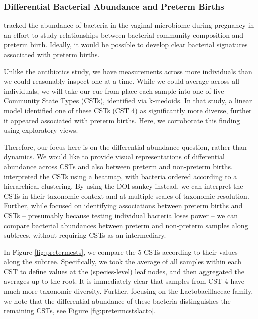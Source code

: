 \documentclass[12pt]{article}
\begin{document}
\subsubsection*{Differential Bacterial Abundance and Preterm
Births}\label{differential-bacterial-abundance-and-preterm-births}

\citet{digiulio2015temporal}
tracked the abundance of bacteria in the vaginal microbiome during
pregnancy in an effort to study relationships between bacterial
community composition and preterm birth. Ideally, it would be possible
to develop clear bacterial signatures associated with preterm births.

Unlike the antibiotics study, we have measurements across more
individuals than we could reasonably inspect one at a time. While we
could average across all individuals, we will take our cue from
\citep{digiulio2015temporal}
place each sample into one of five Community State Types (CSTs),
identified via k-medoids. In that study, a linear model identified one
of these CSTs (CST 4) as significantly more diverse, further it appeared
associated with preterm births. Here, we corroborate this finding using
exploratory views.

Therefore, our focus here is on the differential abundance question,
rather than dynamics. We would like to provide visual representations of
differential abundance across CSTs and also between preterm and non-preterm
births. \citet{digiulio2015temporal} interpreted the CSTs using a heatmap, with
bacteria ordered according to a hierarchical clustering. By using the DOI sankey
instead, we can interpret the CSTs in their taxonomic context and at multiple
scales of taxonomic resolution. Further, while 
\citep{digiulio2015temporal} focused on identifying associations between
preterm births and CSTs -- presumably because testing individual bacteria loses
power -- we can compare bacterial abundances between preterm and non-preterm
samples along subtrees, without requiring CSTs as an intermediary.

In Figure \ref{fig:pretermcsts}, we compare the 5 CSTs according to
their values along the subtree. Specifically, we took the average of all
samples within each CST to define values at the (species-level) leaf
nodes, and then aggregated the averages up to the root. It is
immediately clear that samples from CST 4 have much more taxonomic
diversity. Further, focusing on the Lactobacillaceae family, we note
that the differential abundance of these bacteria distinguishes the
remaining CSTs, see Figure \ref{fig:pretermcstslacto}.
\end{document}
